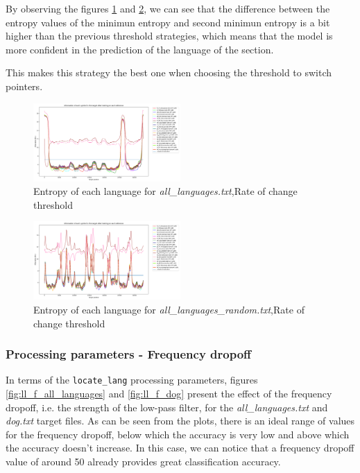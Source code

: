 \documentclass{article}
\begin{document}
By observing the figures \ref{fig:all_languages_t_c} and \ref{fig:all_languages_random_t_c}, we can see that the difference between the entropy values of the minimun entropy
and second minimun entropy is a bit higher than the previous threshold strategies, which means that the model is more confident in the prediction of the language of the section.

This makes this strategy the best one when choosing the threshold to switch pointers.

\begin{figure}
    \centering
    \includegraphics[width=0.5\textwidth]{../results/all_languages/-t_c:0.01.png}
    \caption{Entropy of each language for \textit{all\_languages.txt},Rate of change threshold}
    \label{fig:all_languages_t_c}
\end{figure}

\begin{figure}
    \centering
    \includegraphics[width=0.5\textwidth]{../results/all_languages_random/-t_c:0.01.png}
    \caption{Entropy of each language for \textit{all\_languages\_random.txt},Rate of change threshold}
    \label{fig:all_languages_random_t_c}
\end{figure}

\subsubsection{Processing parameters - Frequency dropoff}
\label{subsubsec:results_locate_lang_frequency_dropoff}

In terms of the \verb|locate_lang| processing parameters, figures \ref{fig:ll_f_all_languages} and \ref{fig:ll_f_dog} present the effect of the frequency dropoff, i.e. the strength of the low-pass filter, for the \textit{all\_languages.txt} and \textit{dog.txt} target files.
As can be seen from the plots, there is an ideal range of values for the frequency dropoff, below which the accuracy is very low and above which the accuracy doesn't increase.
In this case, we can notice that a frequency dropoff value of around 50 already provides great classification accuracy.
\end{document}
